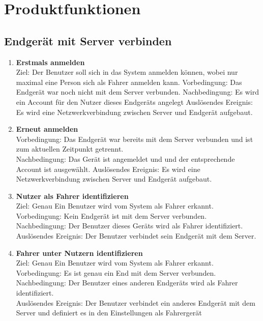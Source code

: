 \documentclass[pflichtenheft.tex]{subfiles}
\begin{document}
\chapter{Produktfunktionen}

\renewcommand{\theenumi}{/FA\ifnum \value{enumi}<10 0\fi\arabic{enumi}0/}
\renewcommand{\labelenumi}{\theenumi}
\renewcommand{\theenumii}{\arabic{enumii}}
\renewcommand{\labelenumii}{/FA\ifnum \value{enumi}<10 0\fi\arabic{enumi}\arabic{enumii}/}

\section{Endgerät mit Server verbinden}
	\begin{enumerate}
		\item{\textbf{Erstmals anmelden}} \label{firstcon}
		\\ Ziel: Der Benutzer soll sich in das System anmelden können, wobei nur maximal eine Person sich als Fahrer anmelden kann.
		Vorbedingung: Das Endgerät war noch nicht mit dem Server verbunden.
		Nachbedingung: Es wird ein Account für den Nutzer dieses Endgeräts angelegt
		Auslösendes Ereignis: Es wird eine Netzwerkverbindung zwischen Server und Endgerät aufgebaut.

		\item{\textbf{Erneut anmelden}} \label{connection}
		\\Vorbedingung: Das Endgerät war bereits mit dem Server verbunden und ist zum aktuellen Zeitpunkt getrennt. \\Nachbedingung: Das Gerät ist angemeldet und und der entsprechende Account ist ausgewählt.
		Auslösendes Ereignis: Es wird eine Netzwerkverbindung zwischen Server und Endgerät aufgebaut.

		\item{\textbf{Nutzer als Fahrer identifizieren}} \label{driver1}
		\\ Ziel: Genau Ein Benutzer wird vom System als Fahrer erkannt.  \\
		Vorbedingung: Kein Endgerät ist mit dem Server verbunden.\\
		Nachbedingung: Der Benutzer dieses Geräts wird als Fahrer identifiziert. \\
		Auslösendes Ereignis: Der Benutzer verbindet sein Endgerät mit dem Server.

		\item{\textbf{Fahrer unter Nutzern identifizieren}} \label{driver2}
		\\ Ziel: Genau Ein Benutzer wird vom System als Fahrer erkannt.  \\
		Vorbedingung: Es ist genau ein End mit dem Server verbunden.\\
		Nachbedingung: Der Benutzer eines anderen Endgeräts wird als Fahrer identifiziert. \\
		Auslösendes Ereignis: Der Benutzer verbindet ein anderes Endgerät mit dem Server und definiert es in den Einstellungen als Fahrergerät

		\setcounter{enumTemp}{\value{enumi}}
		

	\end{enumerate}
	
\end{document}
